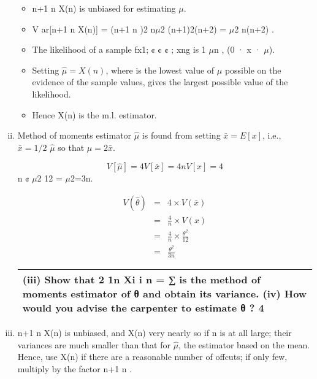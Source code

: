 \documentclass[a4paper,12pt]{article}
\begin{document}
\begin{enumerate}[(i)]
\begin{itemize}
\item n+1
n X(n) is unbiased for estimating $\mu$.
\item V ar[n+1
n X(n)] = (n+1
n )2 n$\mu$2
(n+1)2(n+2) = $\mu$2
n(n+2) .
\item The likelihood of a sample fx1; ¢ ¢ ¢ ; xng is 1
$\mu$n , (0 · x · $\mu$).
\item Setting $\hat{\mu} = X(n)$, where is the lowest value of $\mu$ possible on the evidence of
the sample values, gives the largest possible value of the likelihood.
\item  Hence X(n) is the m.l. estimator.
\end{itemize}
\item Method of moments estimator $\hat{\mu}$ is found from setting $\bar{x} = E[x]$, i.e., $\bar{x} = 1/2$
$\hat{\mu}$
so that $\hat{\mu} = 2\bar{x}$. 

\[V [\hat{\mu}] = 4V [\bar{x}] = 4
nV [x] = 4\]
n ¢ $\mu$2
12 = $\mu$2=3n.

\begin{eqnarray*}
V(\hat{\theta}) &=& 4 \times V(\bar{x})\\
 &=& \frac{4}{n} \times V(x) \\
 &=& \frac{4}{n} \times \frac{\theta^2}{12} \\
 &=& \frac{\theta^2}{3n}
\end{eqnarray*}
  \begin{table}[ht!]
 \centering
 \begin{tabular}{|p{15cm}|}
 \hline  
(iii) Show that 
2 1n
Xi
i
n
= ∑ is the method of moments estimator of 
θ
 and obtain its variance.
(iv) How would you advise the carpenter to estimate 
θ
?
4\\ \hline
  \end{tabular}
\end{table}
\item n+1
n X(n) is unbiased, and X(n) very nearly so if n is at all large; their
variances are much smaller than that for $\hat{\mu}$, the estimator based on the mean.
Hence, use X(n) if there are a reasonable number of offcuts; if only few,
multiply by the factor n+1
n .
\end{enumerate}
\end{document}
